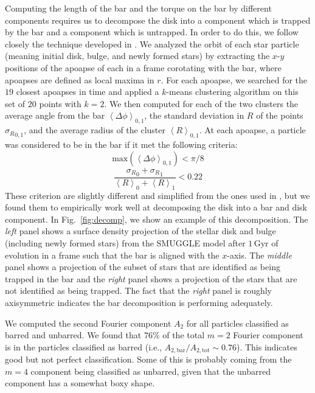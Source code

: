 \documentclass[twocolumn,linenumbers]{aastex631}
\newcommand{\SMUGGLE}{SMUGGLE}
\begin{document}
Computing the length of the bar and the torque on the bar by different
components requires us to decompose the disk into a component which is trapped
by the bar and a component which is untrapped. In order to do this, we follow
closely the technique developed in \citet{2016MNRAS.463.1952P}. We analyzed the
orbit of each star particle (meaning initial disk, bulge, and newly formed
stars) by extracting the $x$-$y$ positions of the apoapse of each in a frame
corotating with the bar, where apoapses are defined as local maxima in $r$. For
each apoapse, we searched for the $19$ closest apoapses in time and applied a
$k$-means clustering algorithm on this set of $20$ points with $k=2$. We then
computed for each of the two clusters the average angle from the bar
$\left<\Delta \phi\right>_{0,1}$, the standard deviation in $R$ of the points
${\sigma_R}_{0,1}$, and the average radius of the cluster
$\left<R\right>_{0,1}$. At each apoapse, a particle was considered to be in the
bar if it met the following criteria:
\begin{equation}
\textrm{max}\left(\left<\Delta \phi\right>_{0,1}\right) < \pi / 8
\end{equation}
\begin{equation}
\frac{{\sigma_R}_0 + {\sigma_R}_1}{\left<R\right>_0 + \left<R\right>_1} < 0.22
\end{equation}
These criterion are slightly different and simplified from the ones used in
\citet{2016MNRAS.463.1952P}, but we found them to empirically work well at
decomposing the disk into a bar and disk component. In Fig.~\ref{fig:decomp}, we
show an example of this decomposition. The \textit{left} panel shows a surface
density projection of the stellar disk and bulge (including newly formed stars)
from the \SMUGGLE{} model after $1\,\text{Gyr}$ of evolution in a frame such that
the bar is aligned with the $x$-axis. The \textit{middle} panel shows a
projection of the subset of stars that are identified as being trapped in the
bar and the \textit{right} panel shows a projection of the stars that are not
identified as being trapped. The fact that the \textit{right} panel is roughly
axisymmetric indicates the bar decomposition is performing adequately.

We computed the second Fourier component $A_2$ for all particles classified as
barred and unbarred. We found that $76\%$ of the total $m=2$ Fourier component
is in the particles classified as barred (i.e.,
$A_{2,\textrm{bar}}/A_{2,\textrm{tot}}\sim0.76$). This indicates good but not
perfect classification. Some of this is probably coming from the $m=4$ component
being classified as unbarred, given that the unbarred component has a somewhat
boxy shape.
\end{document}
